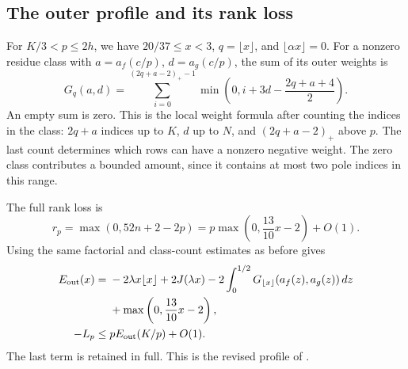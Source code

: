 \subsection{The outer profile and its rank loss}

For \(K/3<p\le2h\), we have \(20/37\le x<3\), \(q=\lfloor x\rfloor\),
and \(\lfloor\alpha x\rfloor=0\). For a nonzero residue class with
\(a=a_f(c/p)\), \(d=a_g(c/p)\), the sum of its outer weights is
\begin{equation}\label{growth:GO}
 G_q(a,d)=
 \sum_{i=0}^{(2q+a-2)_+-1}
 \min\left(0,i+3d-\frac{2q+a+4}{2}\right).
\end{equation}
An empty sum is zero. This is the local weight formula after counting
the indices in the class: \(2q+a\) indices up to \(K\), \(d\) up to
\(N\), and \((2q+a-2)_+\) above \(p\). The last count determines
which rows can have a nonzero negative weight. The zero class
contributes a bounded amount, since it contains at most two pole
indices in this range.
\cite[\texttt{Growth/OuterPrime.lean}, \texttt{sum\_wO\_class}]{firsching}

The full rank loss is
\[
 r_p=\max(0,52n+2-2p)
    =p\max\left(0,\frac{13}{10}x-2\right)+O(1).
\]
Using the same factorial and class-count estimates as before gives
\begin{align}
 E_{\rm out}(x)
 ={}&-2\lambda x\lfloor x\rfloor+2J(\lambda x)
 -2\int_0^{1/2}G_{\lfloor x\rfloor}(a_f(z),a_g(z))\,dz\notag\\
 &+\max\left(0,\frac{13}{10}x-2\right),\label{growth:Eout}\\
 -L_p\le{}&pE_{\rm out}(K/p)+O(1).\label{growth:outer-profile-bound}
\end{align}
The last term is retained in full. This is the revised profile of
\cite[\texttt{Growth/OuterPrime.lean}, \texttt{outer\_Lp\_le}]{firsching}.

